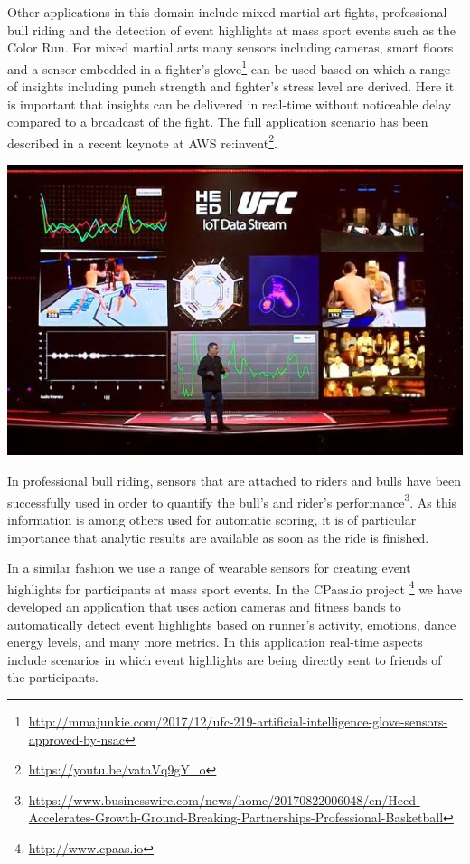 Other applications in this domain include mixed martial art fights, professional bull riding and the detection of event highlights at mass sport events such as the Color Run. For mixed martial arts many sensors including cameras, smart floors and a sensor embedded in a fighter's glove\footnote{\url{http://mmajunkie.com/2017/12/ufc-219-artificial-intelligence-glove-sensors-approved-by-nsac}} can be used based on which a range of insights including punch strength and fighter's stress level are derived. Here it is important that insights can be delivered in real-time without noticeable delay compared to a broadcast of the fight. The full application scenario has been described in a recent keynote at AWS re:invent\footnote{\url{https://youtu.be/vataVq9gY_o}}.

\begin{center}
\includegraphics[scale=0.3]{pictures/DP6L8S9XkAYFMCw.jpg}
\end{center}

In professional bull riding, sensors that are attached to riders and bulls have been successfully used in order to quantify the bull's and rider's performance\footnote{\url{https://www.businesswire.com/news/home/20170822006048/en/Heed-Accelerates-Growth-Ground-Breaking-Partnerships-Professional-Basketball}}. As this information is among others used for automatic scoring, it is of particular importance that analytic results are available as soon as the ride is finished. 

In a similar fashion we use a range of wearable sensors for creating event highlights for participants at mass sport events. In the CPaas.io project \footnote{\url{http://www.cpaas.io}} we have developed an application that uses action cameras and fitness bands to automatically detect event highlights based on runner's activity, emotions, dance energy levels, and many more metrics. In this application real-time aspects include scenarios in which event highlights are being directly sent to friends of the participants. 

